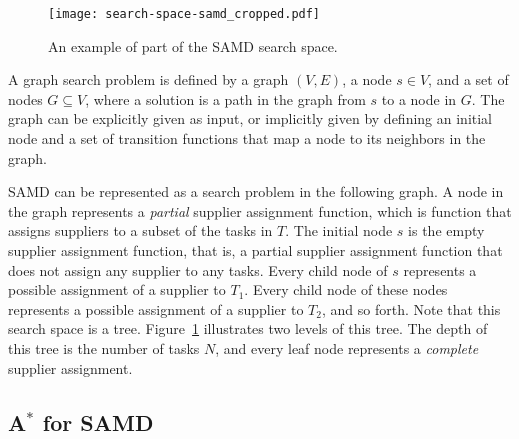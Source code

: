 \documentclass[letterpaper]{article} %
\newcommand{\samd}{\ac{SAMD}\xspace}
\begin{document}
\begin{figure}
    \centering
    \texttt{[image: search-space-samd\_cropped.pdf]}
    \caption{An example of part of the \samd search space.}
    \label{fig:search-space}
\end{figure}

A graph search problem is defined by a graph $(V,E)$,
a node $s\in V$, and a set of nodes $G\subseteq V$,
where a solution is a path in the graph from $s$ to a node in $G$.
The graph can be explicitly given as input, or implicitly given
by defining an initial node and a set of transition functions
that map a node to its neighbors in the graph.

\samd can be represented as a search problem in the following graph. A node in the graph represents a \emph{partial} supplier assignment function,
which is function that assigns suppliers to a subset of the tasks in $T$.
The initial node $s$ is the empty supplier assignment function, that is, a partial supplier assignment function that does not assign any supplier to any tasks.
Every child node of $s$ represents a possible assignment of a supplier to $T_1$.
Every child node of these nodes represents a possible assignment of a supplier to $T_2$,
and so forth. Note that this search space is a tree. Figure~\ref{fig:search-space} illustrates two levels of this tree.
The depth of this tree is the number of tasks $N$, and every leaf node represents a \emph{complete} supplier assignment.


\subsection{A$^*$ for \samd}
\label{sec:astar}
\end{document}
